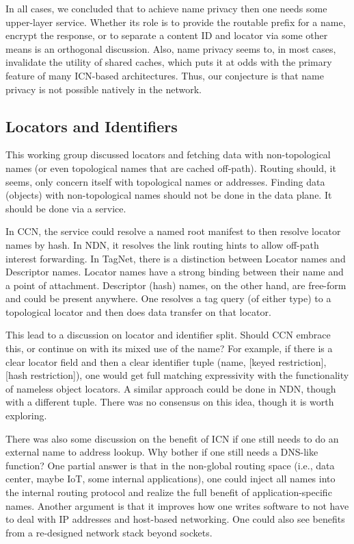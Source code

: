 In all cases, we concluded that to achieve name privacy then one needs some upper-layer service. Whether its role is to provide the routable prefix for a name, encrypt the response, or to separate a content ID and locator via some other means is an orthogonal discussion. Also, name privacy seems to, in most cases, invalidate the utility of shared caches, which puts it at odds with the primary feature of many ICN-based architectures. Thus, our conjecture is that name privacy is not possible natively in the network.


\subsection{Locators and Identifiers}
This working group discussed locators and fetching data with non-topological names (or even topological names that are cached off-path). Routing should, it seems, only concern itself with topological names or addresses.  Finding data (objects) with non-topological names should not be done in the data plane.  It should be done via a service.

In CCN, the service could resolve a named root manifest to then resolve locator names by hash.
In NDN, it resolves the link routing hints to allow off-path interest forwarding. In TagNet,
there is a distinction between Locator names and Descriptor names. Locator names have a
strong binding between their name and a point of attachment. Descriptor (hash) names, on the
other hand, are free-form and could be present anywhere.  One resolves a tag query (of either
type) to a topological locator and then does data transfer on that locator.

This lead to a discussion on locator and identifier split.  Should CCN embrace this, or continue on with its mixed use of the name? For example, if there is a clear locator field and then a clear identifier tuple (name, [keyed restriction], [hash restriction]), one would get full matching expressivity with the functionality of nameless object locators.  A similar approach could be done in NDN, though with a different tuple.  There was no consensus on this idea, though it is worth exploring.

There was also some discussion on the benefit of ICN if one still needs to do an external name to address lookup.  Why bother if one still needs a DNS-like function?  One partial answer is that in the non-global routing space (i.e., data center, maybe IoT, some internal applications), one could inject all names into the internal routing protocol and realize the full benefit of application-specific names.  Another argument is that it improves how one writes software to not have to deal with IP addresses and host-based networking. One could also see benefits from a re-designed network stack beyond sockets.

